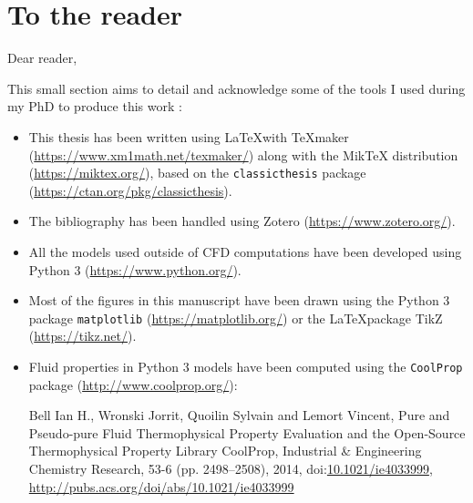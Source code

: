 

\chapter*{To the reader} %


Dear reader,

\npar

This small section aims to detail and acknowledge some of the tools I used during my PhD to produce this work :

\begin{itemize}

\setlength{\itemsep}{10pt}

\item This thesis has been written using \LaTeX with TeXmaker (\url{https://www.xm1math.net/texmaker/}) along with the MikTeX distribution (\url{https://miktex.org/}), based on the \texttt{classicthesis} package (\url{https://ctan.org/pkg/classicthesis}).

\item The bibliography has been handled using Zotero (\url{https://www.zotero.org/}).

\item All the models used outside of CFD computations have been developed using Python 3 (\url{https://www.python.org/}).

\item Most of the figures in this manuscript have been drawn using the Python 3 package \texttt{matplotlib} (\url{https://matplotlib.org/}) or the \LaTeX package TikZ (\url{https://tikz.net/}).

\item Fluid properties in Python 3 models have been computed using the \texttt{CoolProp} package (\url{http://www.coolprop.org/}):

\small{
Bell Ian H., Wronski Jorrit, Quoilin Sylvain and Lemort Vincent, Pure and Pseudo-pure Fluid Thermophysical Property Evaluation and the Open-Source Thermophysical Property Library CoolProp, Industrial \& Engineering Chemistry Research, 53-6 (pp. 2498--2508), 2014, doi:\url{10.1021/ie4033999}, \url{http://pubs.acs.org/doi/abs/10.1021/ie4033999}
}


\end{itemize}


